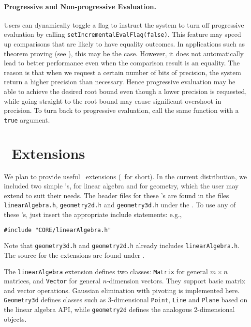 \documentclass[12pt]{article}
\begin{document}
\paragraph{Progressive and Non-progressive Evaluation.}
   Users can dynamically toggle a flag to instruct the system to turn off
   progressive evaluation by calling
   {\tt setIncrementalEvalFlag(false)}.  This feature may 
   speed up comparisons that are likely to have
   equality outcomes.
   In applications such as theorem proving (see \cite{tyl:zero-test:00}),
   this may be the case.
However, it does not automatically
lead to better performance even when the comparison result is an equality.
The reason is that when we request a certain number of bits
of precision, the system return a higher precision than necessary.
Hence progressive evaluation may be able to achieve the
desired root bound even though a lower precision is requested,
while going straight to the root bound may cause significant
overshoot in precision.
   To turn back to progressive evaluation, call the
   same function with a {\tt true} argument.

\section{\corelib\ Extensions}

We plan to provide useful \corelib\ extensions
(\corex\ for short).
In the current distribution, we included two simple
\corex's, for linear algebra and for geometry, which the
user may extend to suit their needs.  
The  header files for these \corex's are found in the files
{\tt linearAlgebra.h}, {\tt geometry2d.h} and {\tt geometry3d.h}
under the .  To use any of these \corex's, just insert
the appropriate include statements: e.g.,
\begin{center}
	{\tt \#include "CORE/linearAlgebra.h"}  
\end{center}
Note that {\tt geometry3d.h} and {\tt geometry2d.h} already
includes {\tt linearAlgebra.h}.
The source for the extensions are found under \extdir.

The {\tt linearAlgebra} extension defines two classes: 
{\tt Matrix} for general $m \times n$ matrices,
and {\tt Vector} for general $n$-dimension vectors. 
They support basic matrix and vector operations. 
Gaussian elimination with pivoting is implemented here.
{\tt Geometry3d} defines classes such as 3-dimensional
{\tt Point}, {\tt Line} and {\tt Plane} based on the linear algebra
API, while {\tt geometry2d} defines the analogous
2-dimensional objects.
\end{document}
